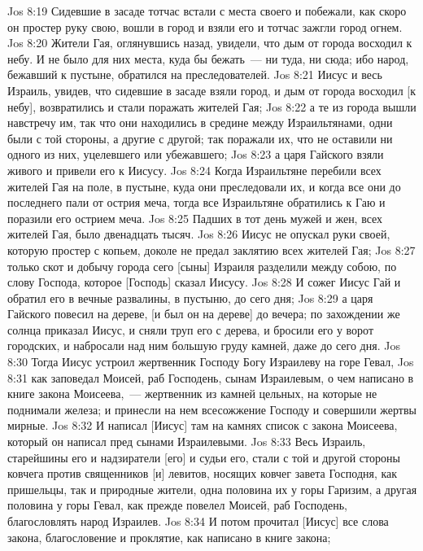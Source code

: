 \vs Jos 8:19 Сидевшие в засаде тотчас встали с места своего и побежали, как скоро он простер руку свою, вошли в город и взяли его и тотчас зажгли город огнем.
\vs Jos 8:20 Жители Гая, оглянувшись назад, увидели, что дым от города восходил к небу. И не было для них места, куда бы бежать~--- ни туда, ни сюда; ибо народ, бежавший к пустыне, обратился на преследователей.
\vs Jos 8:21 Иисус и весь Израиль, увидев, что сидевшие в засаде взяли город, и дым от города восходил [к небу], возвратились и стали поражать жителей Гая;
\vs Jos 8:22 а те из города вышли навстречу им, так что они находились в средине между Израильтянами,  одни были с той стороны, а другие с другой; так поражали их, что не оставили ни одного из них, уцелевшего или убежавшего;
\vs Jos 8:23 а царя Гайского взяли живого и привели его к Иисусу.
\rsbpar\vs Jos 8:24 Когда Израильтяне перебили всех жителей Гая на поле, в пустыне, куда они преследовали их, и когда все они до последнего пали от острия меча, тогда все Израильтяне обратились к Гаю и поразили его острием меча.
\vs Jos 8:25 Падших в тот день мужей и жен, всех жителей Гая, было двенадцать тысяч.
\vs Jos 8:26 Иисус не опускал руки своей, которую простер с копьем, доколе не предал заклятию всех жителей Гая;
\vs Jos 8:27 только скот и добычу города сего [сыны] Израиля разделили между собою, по слову Господа, которое [Господь] сказал Иисусу.
\vs Jos 8:28 И сожег Иисус Гай и обратил его в вечные развалины, в пустыню, до сего дня;
\vs Jos 8:29 а царя Гайского повесил на дереве, [и был он на дереве] до вечера; по захождении же солнца приказал Иисус, и сняли труп его с дерева, и бросили его у ворот городских, и набросали над ним большую груду камней,  даже до сего дня.
\vs Jos 8:30 Тогда Иисус устроил жертвенник Господу Богу Израилеву на горе Гевал,
\vs Jos 8:31 как заповедал Моисей, раб Господень, сынам Израилевым, о чем написано в книге закона Моисеева,~--- жертвенник из камней цельных, на которые не поднимали железа; и принесли на нем всесожжение Господу и совершили жертвы мирные.
\vs Jos 8:32 И написал [Иисус] там на камнях список с закона Моисеева, который он написал пред сынами Израилевыми.
\vs Jos 8:33 Весь Израиль, старейшины его и надзиратели [его] и судьи его, стали с той и другой стороны ковчега против священников [и] левитов, носящих ковчег завета Господня, как пришельцы, так и природные жители, одна половина их у горы Гаризим, а другая половина у горы Гевал, как прежде повелел Моисей, раб Господень, благословлять народ Израилев.
\vs Jos 8:34 И потом прочитал [Иисус] все слова закона, благословение и проклятие, как написано в книге закона;
